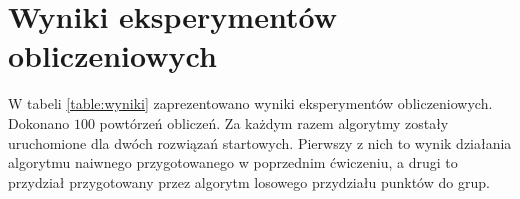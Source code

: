 \documentclass[main.tex]{subfiles}
\begin{document}
\section{Wyniki eksperymentów obliczeniowych}
\label{section:wyniki}
W tabeli \ref{table:wyniki} zaprezentowano wyniki eksperymentów obliczeniowych. Dokonano $100$ powtórzeń obliczeń. Za każdym razem algorytmy zostały uruchomione dla dwóch rozwiązań startowych. Pierwszy z nich to wynik działania algorytmu naiwnego przygotowanego w poprzednim ćwiczeniu, a drugi to przydział przygotowany przez algorytm losowego przydziału punktów do grup.
\begin{table}[H]
\centering
\caption{Wyniki eksperymentów obliczeniowych dla 100 iteracji}
\label{table:wyniki}
\end{table}
\end{document}
